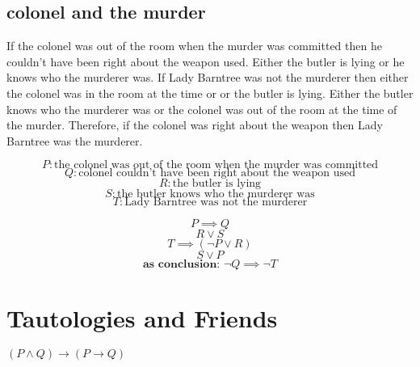 \documentclass[a4paper,12pt]{article}
\begin{document}
\subsection{colonel and the murder}
If the colonel was out of the room when the murder was committed then he couldn't have been right about the weapon used.  Either the butler is lying or he knows who the murderer was.  If Lady Barntree was not the murderer then either the colonel was in the room at the time or or the butler is lying.  Either the butler knows who the murderer was or the colonel was out of the room at the time of the murder.  Therefore, if the colonel was right about the weapon then Lady Barntree was the murderer.

\[
P: \text{the colonel was out of the room when the murder was committed}  
\]
\[
Q: \text{colonel couldn't have been right about the weapon used} 
\]
\[
R: \text{the butler is lying} 
\]
\[
S: \text{the butler knows who the murderer was}
\]
\[
T: \text{Lady Barntree was not the murderer} 
\]

\begin{equation} 
P \implies Q 
\end{equation}
\begin{equation} 
R \vee S
\end{equation}
\begin{equation} 
T \implies (\neg P \vee R)
\end{equation}
\begin{equation} 
S \vee P
\end{equation}
\begin{equation} 
\textbf{as conclusion: } \neg Q \implies \neg T
\end{equation}
\section{Tautologies and Friends}

$(P \wedge Q) \rightarrow (P \rightarrow Q)$\\
\end{document}
